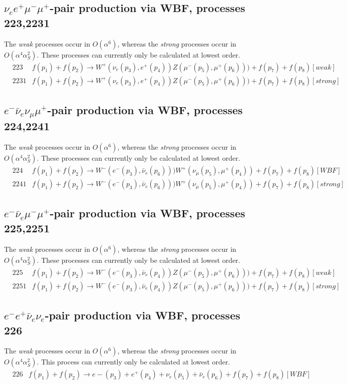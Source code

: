 \documentclass{article}
\begin{document}
{{{{{{\subsection{$\nu_e  e^+ \mu^- \mu^+$-pair production via WBF, processes 223,2231}
The {\it weak} processes occur in $O(\alpha^6)$, whereas the {\it strong} processes occur in $O(\alpha^4 \alpha_S^2)$.
These processes can currently only be calculated at lowest order.
\begin{eqnarray}
& 223  & f(p_1)+f(p_2) \to W^+(\nu_e(p_3),e^+(p_4))Z(\mu^-(p_5),\mu^+(p_6)))+f(p_7)+f(p_8) [weak]  \nonumber \\
& 2231 & f(p_1)+f(p_2) \to W^+(\nu_e(p_3),e^+(p_4))Z(\mu^-(p_5),\mu^+(p_6)))+f(p_7)+f(p_8) [strong]  \nonumber
\end{eqnarray}

\subsection{$e^- \bar\nu_{e} \nu_{\mu} \mu^+$-pair production via WBF, processes 224,2241}
The {\it weak} processes occur in $O(\alpha^6)$, whereas the {\it strong} processes occur in $O(\alpha^4 \alpha_S^2)$.
These processes can currently only be calculated at lowest order.
\begin{eqnarray}
&224   & f(p_1)+f(p_2) \to W^-(e^-(p_3),\bar{\nu}_e(p_6)))W^+(\nu_\mu(p_5),\mu^+(p_4))+f(p_7)+f(p_8) [WBF]    \nonumber \\
&2241  & f(p_1)+f(p_2) \to W^-(e^-(p_3),\bar{\nu}_e(p_6)))W^+(\nu_\mu(p_5),\mu^+(p_4))+f(p_7)+f(p_8) [strong]  \nonumber   
\end{eqnarray}
%
\subsection{$e^- \bar\nu_{e} \mu^- \mu^+$-pair production via WBF, processes 225,2251}
The {\it weak} processes occur in $O(\alpha^6)$, whereas the {\it strong} processes occur in $O(\alpha^4 \alpha_S^2)$.
These processes can currently only be calculated at lowest order.
\begin{eqnarray}
&225   & f(p_1)+f(p_2) \to W^-(e^-(p_3),\bar{\nu}_e(p_4))Z(\mu^-(p_5),\mu^+(p_6)))+f(p_7)+f(p_8) [weak]    \nonumber \\
&2251  &  f(p_1)+f(p_2) \to W^-(e^-(p_3),\bar{\nu}_e(p_4))Z(\mu^-(p_5),\mu^+(p_6)))+f(p_7)+f(p_8) [strong]  \nonumber  
\end{eqnarray}


\subsection{$e^- e^+ \bar\nu_{e} \nu_{e}$-pair production via WBF, processes 226}
The {\it weak} processes occur in $O(\alpha^6)$, whereas the {\it strong} processes occur in $O(\alpha^4 \alpha_S^2)$.
This process can currently only be calculated at lowest order.
\begin{eqnarray}
&226  &  f(p_1)+f(p_2) \to e-(p_3)+e^+(p_4)+\nu_e(p_5)+\bar{\nu}_e(p_6)+f(p_7)+f(p_8) [WBF]    \nonumber
\end{eqnarray}

}}}}}}
\end{document}
